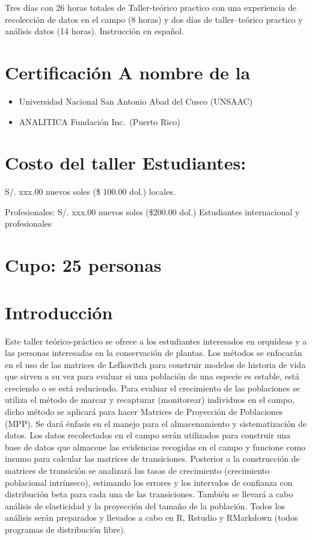 \documentclass[
]{book}
\theoremstyle{definition}
\theoremstyle{definition}
\theoremstyle{definition}
\theoremstyle{definition}
\theoremstyle{remark}
\begin{document}
Tres días con 26 horas totales de Taller-teórico practico con una
experiencia de recolección de datos en el campo (8 horas) y dos días de
taller--teórico practico y análisis datos (14 horas). Instrucción en
español.

\hypertarget{certificaciuxf3n-a-nombre-de-la}{%
\section{Certificación A nombre de la}\label{certificaciuxf3n-a-nombre-de-la}}

\begin{itemize}
\item
  Universidad Nacional San Antonio Abad del Cusco (UNSAAC)
\item
  ANALITICA Fundación Inc.~(Puerto Rico)
\end{itemize}

\hypertarget{costo-del-taller-estudiantes}{%
\section{Costo del taller Estudiantes:}\label{costo-del-taller-estudiantes}}

S/. xxx.00 nuevos soles (\$ 100.00 dol.) locales.

Profesionales: S/. xxx.00 nuevos soles (\$200.00 dol.) Estudiantes
internacional y profesionales

\hypertarget{cupo-25-personas}{%
\section{Cupo: 25 personas}\label{cupo-25-personas}}

\hypertarget{introducciuxf3n}{%
\section{Introducción}\label{introducciuxf3n}}

Este taller teórico-práctico se ofrece a los estudiantes interesados en
orquídeas y a las personas interesadas en la conservación de plantas.
Los métodos se enfocarán en el uso de las matrices de Lefkovitch para
construir modelos de historia de vida que sirven a su vez para evaluar
si una población de una especie es estable, está creciendo o se está
reduciendo. Para evaluar el crecimiento de las poblaciones se utiliza el
método de marcar y recapturar (monitorear) individuos en el campo, dicho
método se aplicará para hacer Matrices de Proyección de Poblaciones
(MPP). Se dará énfasis en el manejo para el almacenamiento y
sistematización de datos. Los datos recolectados en el campo serán
utilizados para construir una base de datos que almacene las evidencias
recogidas en el campo y funcione como insumo para calcular las matrices
de transiciones. Posterior a la construcción de matrices de transición
se analizará las tasas de crecimiento (crecimiento poblacional
intrínseco), estimando los errores y los intervalos de confianza con
distribución beta para cada una de las transiciones. También se llevará
a cabo análisis de elasticidad y la proyección del tamaño de la
población. Todos los análisis serán preparados y llevados a cabo en R,
Rstudio y RMarkdown (todos programas de distribución libre).
\end{document}
